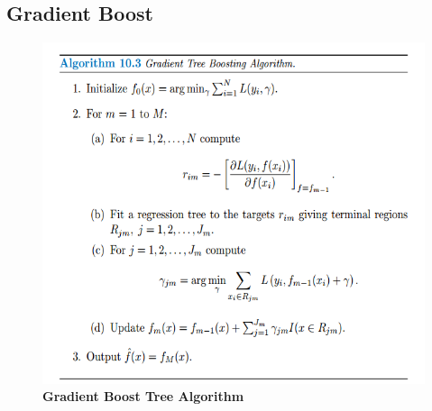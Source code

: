 \documentclass[11pt]{article}
\begin{document}
\subsection{Gradient Boost}
\begin{figure}
\begin{minipage}[t]{1\linewidth}
  \centering
  \centerline{\includegraphics[scale = 0.4]{grad_boost.png}}
\end{minipage}
\caption{\footnotesize{\textbf{Gradient Boost Tree Algorithm \citep{hastie2009elements}}}}
\label{fig: grad_boost}
\end{figure}
\end{document}
